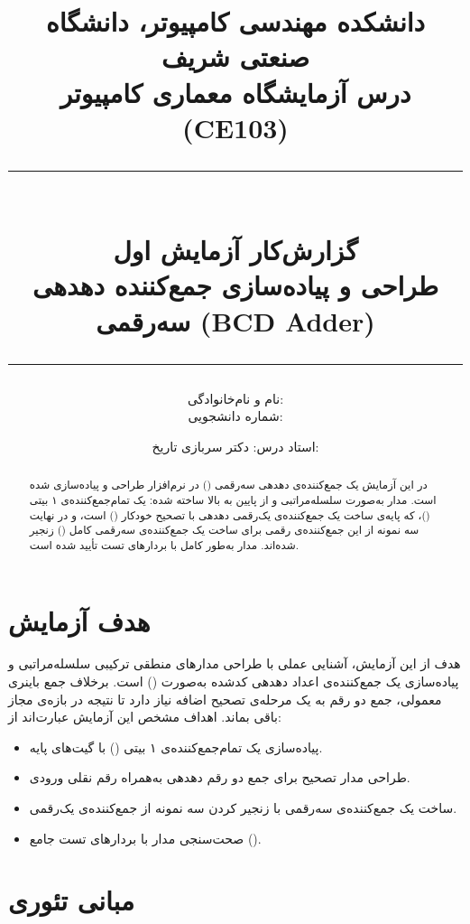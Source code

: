 \documentclass[12pt]{article}
\title{
  {\Large دانشکده مهندسی کامپیوتر، دانشگاه صنعتی شریف}\\[2mm]
  {\large درس آزمایشگاه معماری کامپیوتر (CE103)}\\[8mm]
  \rule{\linewidth}{0.6pt}\\[4mm]
  {\huge \bfseries گزارش‌کار آزمایش اول}\\[2mm]
  {\Large طراحی و پیاده‌سازی جمع‌کننده دهدهی سه‌رقمی (BCD Adder)}\\[2mm]
  \rule{\linewidth}{0.6pt}
}
\author{نام و نام‌خانوادگی: \dotfill \\ شماره دانشجویی: \dotfill}
\date{استاد درس: دکتر سربازی \hspace{1cm} تاریخ: \dotfill}
\begin{document}
\maketitle
\thispagestyle{empty}

\begin{abstract}
در این آزمایش یک جمع‌کننده‌ی دهدهی سه‌رقمی () در نرم‌افزار  طراحی و پیاده‌سازی شده است. مدار به‌صورت سلسله‌مراتبی و از پایین به بالا ساخته شده: یک تمام‌جمع‌کننده‌ی ۱ بیتی ()، که پایه‌ی ساخت یک جمع‌کننده‌ی یک‌رقمی دهدهی با تصحیح خودکار  () است، و در نهایت سه نمونه از این جمع‌کننده‌ی رقمی برای ساخت یک جمع‌کننده‌ی سه‌رقمی کامل () زنجیر شده‌اند. مدار به‌طور کامل با بردارهای تست تأیید شده است.
\end{abstract}

\tableofcontents
\newpage

\section{هدف آزمایش}

هدف از این آزمایش، آشنایی عملی با طراحی مدارهای منطقی ترکیبی سلسله‌مراتبی و پیاده‌سازی یک جمع‌کننده‌ی اعداد دهدهی کدشده به‌صورت  () است. برخلاف جمع باینری معمولی، جمع دو رقم  به یک مرحله‌ی تصحیح اضافه نیاز دارد تا نتیجه در بازه‌ی مجاز  باقی بماند. اهداف مشخص این آزمایش عبارت‌اند از:

\begin{itemize}
  \item پیاده‌سازی یک تمام‌جمع‌کننده‌ی ۱ بیتی () با گیت‌های پایه.
  \item طراحی مدار تصحیح  برای جمع دو رقم دهدهی به‌همراه رقم نقلی ورودی.
  \item ساخت یک جمع‌کننده‌ی سه‌رقمی با زنجیر کردن سه نمونه از جمع‌کننده‌ی یک‌رقمی.
  \item صحت‌سنجی مدار با بردارهای تست جامع ().
\end{itemize}

\section{مبانی تئوری}
\end{document}
